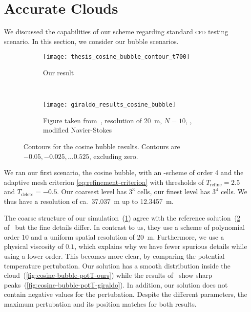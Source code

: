 \section{Accurate Clouds}
We discussed the capabilities of our scheme regarding standard \textsc{cfd} testing scenario.
In this section, we consider our bubble scenarios.
\begin{figure}[htb]
  \centering
  \begin{subfigure}[t]{0.5\textwidth}
    \centering
    \texttt{[image: thesis\_cosine\_bubble\_contour\_t700]}
    \caption{\label{fig:cosine-bubble-contour-ours}%
      Our result}
  \end{subfigure}~%
  \begin{subfigure}[t]{0.5\textwidth}
    \centering
    \texttt{[image: giraldo\_results\_cosine\_bubble]}
    \caption{\label{fig:cosine-bubble-contour-giraldo}%
      Figure taken from~\cite{giraldo2008study}, resolution of \SI{20}{\m}, $N = 10$, \dg{}, modified Navier-Stokes} %
  \end{subfigure}
  \caption{\label{fig:cosine-bubble-contour}%
    Contours for the cosine bubble results.
    Contours are $-0.05, -0.025, \ldots 0.525$, excluding zero.
  }
\end{figure}
We ran our first scenario, the cosine bubble, with an \aderdg{}-scheme of order 4 and the adaptive mesh criterion \cref{eq:refinement-criterion} with thresholds of $T_\text{refine} = 2.5$ and $T_\text{delete} = -0.5$.
Our coarsest level has $3^3$ cells, our finest level has $3^4$ cells.
We thus have a resolution of ca.\ \SI{37.037}{\m} up to \SI{12.3457}{\m}.

The coarse structure of our simulation~(\cref{fig:cosine-bubble-contour-ours}) agree with the reference solution~(\cref{fig:cosine-bubble-contour-giraldo} of~\cite{giraldo2008study} but the fine details differ.
In contrast to us, they use a scheme of polynomial order 10 and a uniform spatial resolution of \SI{20}{\m}.
Furthermore, we use a physical viscosity of $0.1$, which explains why we have fewer spurious details while using a lower order.
This becomes more clear, by comparing the potential temperature pertubation.
Our solution has a smooth distribution inside the cloud~(\cref{fig:cosine-bubble-potT-ours}) while the results of~\cite{giraldo2008study} show sharp peaks~(\cref{fig:cosine-bubble-potT-giraldo}).
In addition, our solution does not contain negative values for the pertubation.
Despite the different parameters, the maximum pertubation and its position matches for both results.

